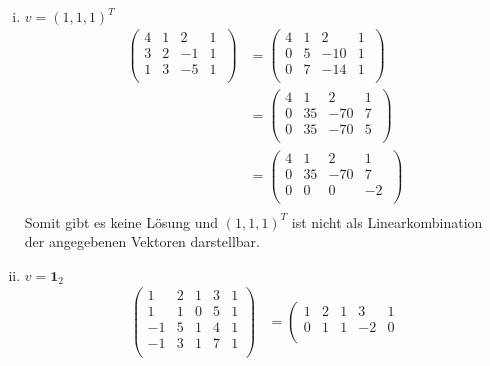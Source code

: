 \documentclass{article}
\begin{document}
\begin{enumerate}[(i)]
\item $v = (1,1,1)^T$
  \begin{align*}
    \left(
    \begin{array}{ccc|c}
      4 & 1 & 2  & 1 \\
      3 & 2 & -1 & 1 \\
      1 & 3 & -5 & 1 \\
    \end{array}\
    \right)
    &=
    \left(
    \begin{array}{ccc|c}
      4 & 1 & 2   & 1 \\
      0 & 5 & -10 & 1 \\
      0 & 7 & -14 & 1 \\
    \end{array}\
    \right) \\
    &=
    \left(
    \begin{array}{ccc|c}
      4 & 1 & 2   & 1 \\
      0 & 35 & -70 & 7 \\
      0 & 35 & -70 & 5 \\
    \end{array}\
    \right) \\
    &=
    \left(
    \begin{array}{ccc|c}
      4 & 1  & 2   & 1 \\
      0 & 35 & -70 & 7 \\
      0 & 0  & 0   & -2 \\
    \end{array}\
    \right) \\
  \end{align*}
  Somit gibt es keine Lösung und $(1,1,1)^T$ ist nicht als Linearkombination der angegebenen Vektoren darstellbar.
\item $v = \bm{1}_2$
  \begin{align*}
    \left(
    \begin{array}{cccc|c}
      1  & 2 & 1 & 3 & 1 \\
      1  & 1 & 0 & 5 & 1 \\
      -1 & 5 & 1 & 4 & 1 \\
      -1 & 3 & 1 & 7 & 1 \\
    \end{array}
    \right)
    &=
    \left(
    \begin{array}{cccc|c}
      1  & 2 & 1 & 3  & 1 \\
      0  & 1 & 1 & -2 & 0 \\

\end{array}
\end{align*}
\end{enumerate}
\end{document}
